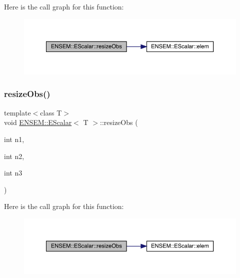 Here is the call graph for this function\+:
\nopagebreak
\begin{figure}[H]
\begin{center}
\leavevmode
\includegraphics[width=350pt]{d0/d82/classENSEM_1_1EScalar_ad4fe54c2fb8a3420e1e452228d8d40b1_cgraph}
\end{center}
\end{figure}
\mbox{\label{classENSEM_1_1EScalar_a1849b1cf66ab1a983ca9e1f268afd109}} 
\subsubsection{\texorpdfstring{resizeObs()}{resizeObs()}\hspace{0.1cm}{\footnotesize\ttfamily [7/12]}}
{\footnotesize\ttfamily template$<$class T$>$ \\
void \mbox{\hyperlink{classENSEM_1_1EScalar}{E\+N\+S\+E\+M\+::\+E\+Scalar}}$<$ T $>$\+::resize\+Obs (\begin{DoxyParamCaption}\item[{int}]{n1,  }\item[{int}]{n2,  }\item[{int}]{n3 }\end{DoxyParamCaption})\hspace{0.3cm}{\ttfamily [inline]}}

Here is the call graph for this function\+:
\nopagebreak
\begin{figure}[H]
\begin{center}
\leavevmode
\includegraphics[width=350pt]{d0/d82/classENSEM_1_1EScalar_a1849b1cf66ab1a983ca9e1f268afd109_cgraph}
\end{center}
\end{figure}
\mbox{\label{classENSEM_1_1EScalar_a1849b1cf66ab1a983ca9e1f268afd109}} 
